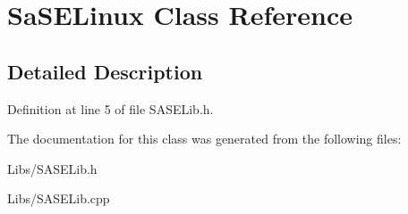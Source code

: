 \hypertarget{class_sa_s_e_linux}{}\section{Sa\+S\+E\+Linux Class Reference}
\label{class_sa_s_e_linux}


\subsection{Detailed Description}


Definition at line 5 of file S\+A\+S\+E\+Lib.\+h.



The documentation for this class was generated from the following files\+:\begin{DoxyCompactItemize}
\item 
Libs/S\+A\+S\+E\+Lib.\+h\item 
Libs/S\+A\+S\+E\+Lib.\+cpp\end{DoxyCompactItemize}
